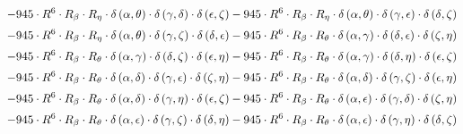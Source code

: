 \begin{subequations}
\begin{gather}
 \\[0.2em] \notag 		 - 945 \cdot R^{6} \cdot R_{\beta{}} \cdot R_{\eta{}} \cdot \delta{}\left(\alpha{}, \theta{}\right) \cdot \delta{}\left(\gamma{}, \delta{}\right) \cdot \delta{}\left(\epsilon{}, \zeta{}\right)- 945 \cdot R^{6} \cdot R_{\beta{}} \cdot R_{\eta{}} \cdot \delta{}\left(\alpha{}, \theta{}\right) \cdot \delta{}\left(\gamma{}, \epsilon{}\right) \cdot \delta{}\left(\delta{}, \zeta{}\right) 
 \\[0.2em] \notag 		 - 945 \cdot R^{6} \cdot R_{\beta{}} \cdot R_{\eta{}} \cdot \delta{}\left(\alpha{}, \theta{}\right) \cdot \delta{}\left(\gamma{}, \zeta{}\right) \cdot \delta{}\left(\delta{}, \epsilon{}\right)- 945 \cdot R^{6} \cdot R_{\beta{}} \cdot R_{\theta{}} \cdot \delta{}\left(\alpha{}, \gamma{}\right) \cdot \delta{}\left(\delta{}, \epsilon{}\right) \cdot \delta{}\left(\zeta{}, \eta{}\right) 
 \\[0.2em] \notag 		 - 945 \cdot R^{6} \cdot R_{\beta{}} \cdot R_{\theta{}} \cdot \delta{}\left(\alpha{}, \gamma{}\right) \cdot \delta{}\left(\delta{}, \zeta{}\right) \cdot \delta{}\left(\epsilon{}, \eta{}\right)- 945 \cdot R^{6} \cdot R_{\beta{}} \cdot R_{\theta{}} \cdot \delta{}\left(\alpha{}, \gamma{}\right) \cdot \delta{}\left(\delta{}, \eta{}\right) \cdot \delta{}\left(\epsilon{}, \zeta{}\right) 
 \\[0.2em] \notag 		 - 945 \cdot R^{6} \cdot R_{\beta{}} \cdot R_{\theta{}} \cdot \delta{}\left(\alpha{}, \delta{}\right) \cdot \delta{}\left(\gamma{}, \epsilon{}\right) \cdot \delta{}\left(\zeta{}, \eta{}\right)- 945 \cdot R^{6} \cdot R_{\beta{}} \cdot R_{\theta{}} \cdot \delta{}\left(\alpha{}, \delta{}\right) \cdot \delta{}\left(\gamma{}, \zeta{}\right) \cdot \delta{}\left(\epsilon{}, \eta{}\right) 
 \\[0.2em] \notag 		 - 945 \cdot R^{6} \cdot R_{\beta{}} \cdot R_{\theta{}} \cdot \delta{}\left(\alpha{}, \delta{}\right) \cdot \delta{}\left(\gamma{}, \eta{}\right) \cdot \delta{}\left(\epsilon{}, \zeta{}\right)- 945 \cdot R^{6} \cdot R_{\beta{}} \cdot R_{\theta{}} \cdot \delta{}\left(\alpha{}, \epsilon{}\right) \cdot \delta{}\left(\gamma{}, \delta{}\right) \cdot \delta{}\left(\zeta{}, \eta{}\right) 
 \\[0.2em] \notag 		 - 945 \cdot R^{6} \cdot R_{\beta{}} \cdot R_{\theta{}} \cdot \delta{}\left(\alpha{}, \epsilon{}\right) \cdot \delta{}\left(\gamma{}, \zeta{}\right) \cdot \delta{}\left(\delta{}, \eta{}\right)- 945 \cdot R^{6} \cdot R_{\beta{}} \cdot R_{\theta{}} \cdot \delta{}\left(\alpha{}, \epsilon{}\right) \cdot \delta{}\left(\gamma{}, \eta{}\right) \cdot \delta{}\left(\delta{}, \zeta{}\right) 

\end{gather}
\end{subequations}
